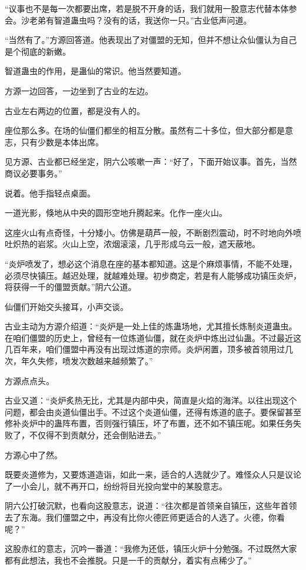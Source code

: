 \begin{this_body}
“议事也不是每一次都要出席，若是脱不开身的话，我们就用一股意志代替本体参会。沙老弟有智道蛊虫吗？没有的话，我送你一只。”古业低声问道。

“当然有了。”方源回答道。他表现出了对僵盟的无知，但并不想让众仙僵认为自己是个彻底的新嫩。

智道蛊虫的作用，是蛊仙的常识。他当然要知道。

方源一边回答，一边坐到了古业的左边。

古业左右两边的位置，都是没有人的。

座位那么多。在场的仙僵们都坐的相互分散。虽然有二十多位，但大部分都是意志，只有少数是本体出席。

见方源、古业都已经坐定，阴六公咳嗽一声：“好了，下面开始议事。首先，当然商议必要事务。”

说着。他手指轻点桌面。

一道光影，倏地从中央的圆形空地升腾起来。化作一座火山。

这座火山有点奇怪，十分矮小。仿佛是葫芦一般，不断剧烈震动，时不时地向外喷吐炽热的岩浆。火山上空，浓烟滚滚，几乎形成乌云一般，遮天蔽地。

“炎炉喷发了，想必这个消息在座的基本都知道。这是个麻烦事情，不能不处理，必须尽快镇压。越迟处理，就越难处理。初步商定，若是有人能够成功镇压炎炉，将获得一千的僵盟贡献。”阴六公道。

仙僵们开始交头接耳，小声交谈。

古业主动为方源介绍道：“炎炉是一处上佳的炼蛊场地，尤其擅长炼制炎道蛊虫。在咱们僵盟的历史上，曾经有一位炼道仙僵，就在炎炉中炼出过仙蛊。不过最近这几百年来，咱们僵盟中再没有出现过炼道的宗师。炎炉闲置，顶多被首领用过几次，年久失修，喷发次数越来越频繁了。”

方源点点头。

古业又道：“炎炉炙热无比，尤其是内部中央，简直是火焰的海洋。以往出现这个问题，都会由炎道仙僵出手。不过这个炎道仙僵，还得有炼道的底子。要保留甚至修补炎炉中的蛊阵布置，否则强行镇压，坏了布置，还不如不镇压呢。如果任务失败了，不仅得不到贡献分，还会倒贴进去。”

方源心中了然。

既要炎道修为，又要炼道造诣，如此一来，适合的人选就少了。难怪众人只是议论了一小会儿，就不再开口，纷纷将目光投向堂中的某股意志。

阴六公打破沉默，也看向这股意志，说道：“往次都是首领亲自镇压，这些年首领去了东海。我们僵盟之中，再没有比你火德匠师更适合的人选了。火德，你看呢？”

这股赤红的意志，沉吟一番道：“我修为还低，镇压火炉十分勉强。不过既然大家都有此想法，我也不会推脱。只是一千的贡献分，着实有点稀少了。”


\end{this_body}
